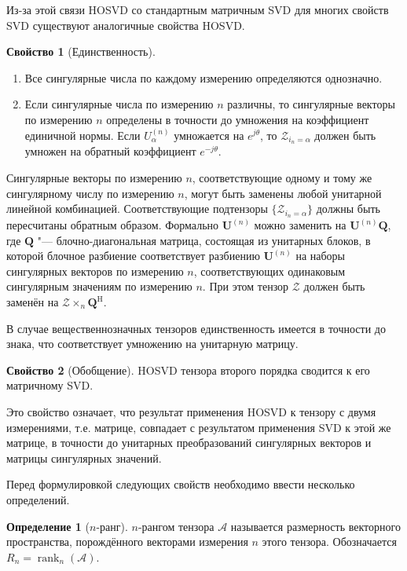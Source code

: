 \documentclass[specialist,
    substylefile = spbu_report.rtx,
    subf,href,colorlinks=true, 12pt]{disser}
\theoremstyle{plain}
\theoremstyle{definition}
\newtheorem{definition}{Определение}[section]
\newtheorem{property}{Свойство}[section]
\theoremstyle{remark}
\begin{document}
    Из-за этой связи HOSVD со стандартным матричным SVD для многих свойств SVD существуют аналогичные свойства HOSVD\@.
    \begin{property}[Единственность]
        \leavevmode
        \begin{enumerate}
            \item Все сингулярные числа по каждому измерению определяются однозначно.
            \item Если сингулярные числа по измерению $n$ различны, то сингулярные векторы по измерению $n$ определены
            в точности до умножения на коэффициент единичной нормы.
            Если $U_\alpha^{(n)}$ умножается на $e^{j\theta}$, то $\mathcal{Z}_{i_n=\alpha}$ должен быть умножен на обратный
            коэффициент $e^{-j\theta}$.
        \end{enumerate}
        Сингулярные векторы по измерению $n$, соответствующие одному и тому же сингулярному числу по измерению $n$,
        могут быть заменены любой унитарной линейной комбинацией.
        Соответствующие подтензоры $\{\mathcal{Z}_{i_n=\alpha}\}$ должны быть пересчитаны обратным образом.
        Формально $\mathbf{U}^{(n)}$ можно заменить на $\mathbf{U}^{(n)}\mathbf{Q}$, где $\mathbf{Q}$ "--- блочно-диагональная
        матрица, состоящая из унитарных блоков, в которой блочное разбиение соответствует разбиению $\mathbf{U}^{(n)}$
        на наборы сингулярных векторов по измерению $n$, соответствующих одинаковым сингулярным значениям по измерению $n$.
        При этом тензор $\mathcal{Z}$ должен быть заменён на $\mathcal{Z}\times_{n} \mathbf{Q}^{\mathrm{H}}$.

        В случае вещественнозначных тензоров единственность имеется в точности до знака, что соответствует
        умножению на унитарную матрицу.
    \end{property}

    \begin{property}[Обобщение]
        HOSVD тензора второго порядка сводится к его матричному SVD\@.
    \end{property}
    Это свойство означает, что результат применения HOSVD к тензору с двумя измерениями, т.е. матрице, совпадает
    с результатом применения SVD к этой же матрице, в точности до унитарных преобразований сингулярных векторов и
    матрицы сингулярных значений.

    Перед формулировкой следующих свойств необходимо ввести несколько определений.
    \begin{definition}[$n$-ранг]
        $n$-рангом тензора $\mathcal{A}$ называется размерность векторного пространства, порождённого векторами измерения $n$ этого тензора.
        Обозначается $R_n=\operatorname{rank}_{n}(\mathcal{A})$.
    \end{definition}
\end{document}
